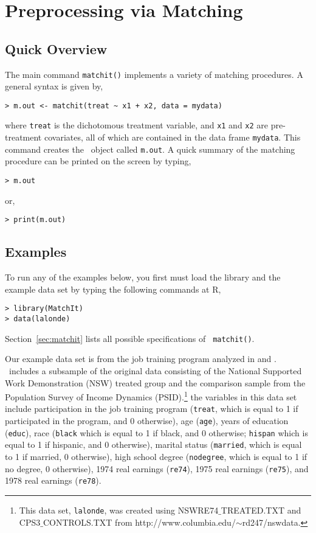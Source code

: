 \section{Preprocessing via Matching}
\label{sec:matching}

\subsection{Quick Overview}

The main command \texttt{matchit()} implements a variety of matching
procedures.  A general syntax is given by,
\begin{verbatim}
> m.out <- matchit(treat ~ x1 + x2, data = mydata)
\end{verbatim}
where {\tt treat} is the dichotomous treatment variable, and {\tt x1}
and {\tt x2} are pre-treatment covariates, all of which are contained
in the data frame {\tt mydata}.  This command creates the
\MatchIt\, object called \texttt{m.out}.  A quick summary of the
matching procedure can be printed on the screen by typing,
\begin{verbatim}
> m.out
\end{verbatim}
or,
\begin{verbatim}
> print(m.out)
\end{verbatim}

\subsection{Examples}

To run any of the examples below, you first must load the library and
the example data set by typing the following commands at R,
\begin{verbatim}
> library(MatchIt)
> data(lalonde)
\end{verbatim}
Section~\ref{sec:matchit} lists all possible specifications of {\tt
  matchit()}.

Our example data set is from the job training program analyzed in
\citet{lalonde86} and \citet{DehWah99}. \MatchIt\ includes a subsample
of the original data consisting of the National Supported Work
Demonstration (NSW) treated group and the comparison sample from the
Population Survey of Income Dynamics (PSID).\footnote{This data set,
  \texttt{lalonde}, was created using NSWRE74$\_$TREATED.TXT and
  CPS3$\_$CONTROLS.TXT from
  http://www.columbia.edu/$\sim$rd247/nswdata.}  the variables in this
data set include participation in the job training program
(\texttt{treat}, which is equal to 1 if participated in the program,
and 0 otherwise), age ({\tt age}), years of education ({\tt educ}),
race (\texttt{black} which is equal to 1 if black, and 0 otherwise;
\texttt{hispan} which is equal to 1 if hispanic, and 0 otherwise),
marital status (\texttt{married}, which is equal to 1 if married, 0
otherwise), high school degree (\texttt{nodegree}, which is equal to 1
if no degree, 0 otherwise), 1974 real earnings (\texttt{re74}), 1975
real earnings (\texttt{re75}), and 1978 real earnings (\texttt{re78}).

